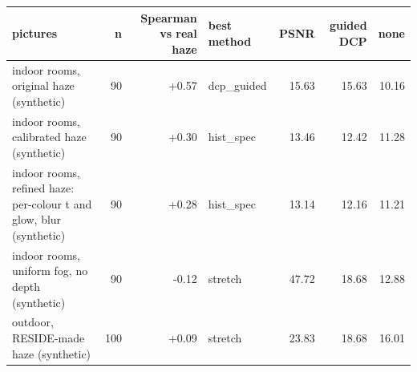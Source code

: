 \begin{tabular}{lrrlrrr}
\toprule
pictures & n & Spearman vs real haze & best method & PSNR & guided DCP & none \\
\midrule
indoor rooms, original haze (synthetic) & 90 & +0.57 & dcp\_guided & 15.63 & 15.63 & 10.16 \\
indoor rooms, calibrated haze (synthetic) & 90 & +0.30 & hist\_spec & 13.46 & 12.42 & 11.28 \\
indoor rooms, refined haze: per-colour t and glow, blur (synthetic) & 90 & +0.28 & hist\_spec & 13.14 & 12.16 & 11.21 \\
indoor rooms, uniform fog, no depth (synthetic) & 90 & -0.12 & stretch & 47.72 & 18.68 & 12.88 \\
outdoor, RESIDE-made haze (synthetic) & 100 & +0.09 & stretch & 23.83 & 18.68 & 16.01 \\
\bottomrule
\end{tabular}
